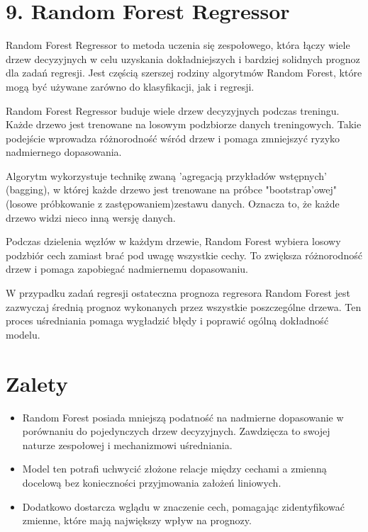 {}
\justify
\fontsize{14}{16}\selectfont
\setlength{\parindent}{0pt}
\section*{9. Random Forest Regressor \cite{alma991000280759708832}}
\label{sec:machine_learning_overview}
\fontsize{12}{14}\selectfont
\vspace{-1.0em}

Random Forest Regressor to metoda uczenia się zespołowego, która łączy wiele drzew decyzyjnych w celu uzyskania dokładniejszych i bardziej solidnych prognoz dla zadań regresji. Jest częścią szerszej rodziny algorytmów Random Forest, które mogą być używane zarówno do klasyfikacji, jak i regresji.

Random Forest Regressor buduje wiele drzew decyzyjnych podczas treningu. Każde drzewo jest trenowane na losowym podzbiorze danych treningowych. Takie podejście wprowadza różnorodność wśród drzew i pomaga zmniejszyć ryzyko nadmiernego dopasowania.

Algorytm wykorzystuje technikę zwaną 'agregacją przykładów wstępnych' (bagging), w której każde drzewo jest trenowane na próbce "bootstrap'owej" (losowe próbkowanie z zastępowaniem)zestawu danych. Oznacza to, że każde drzewo widzi nieco inną wersję danych.

Podczas dzielenia węzłów w każdym drzewie, Random Forest wybiera losowy podzbiór cech zamiast brać pod uwagę wszystkie cechy. To zwiększa różnorodność drzew i pomaga zapobiegać nadmiernemu dopasowaniu.

W przypadku zadań regresji ostateczna prognoza regresora Random Forest jest zazwyczaj średnią prognoz wykonanych przez wszystkie poszczególne drzewa. Ten proces uśredniania pomaga wygładzić błędy i poprawić ogólną dokładność modelu.

{}
\section*{Zalety }
\vspace{-1.0em}


\begin{itemize}

\item Random Forest posiada mniejszą podatność na nadmierne dopasowanie w porównaniu do pojedynczych drzew decyzyjnych. Zawdzięcza to swojej naturze zespołowej i mechanizmowi uśredniania. 

\item Model ten potrafi uchwycić złożone relacje między cechami a zmienną docelową bez konieczności przyjmowania założeń liniowych.

\item Dodatkowo dostarcza wglądu w znaczenie cech, pomagając zidentyfikować zmienne, które mają największy wpływ na prognozy.

\end{itemize}

